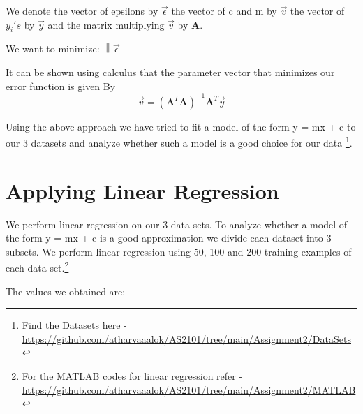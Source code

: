 \documentclass[14pt]{article}
\begin{document}
    \noindent We denote the vector of epsilons by $ \vec{\epsilon} $ the vector of c and m by $ \vec{v} $ the vector of $ y_{i}'s $ by $ \vec{y} $ and the matrix multiplying $ \vec{v} $ by $ \textbf{A} $.

    \noindent We want to minimize:
    $ \left\lVert \vec{\epsilon} \right\rVert $


    \noindent It can be shown using calculus that the parameter vector that minimizes our error function is given By
    \[ \vec{v} = (\textbf{A}^{T} \textbf{A})^{-1} \textbf{A}^{T} \vec{y} \]


    Using the above approach we have tried to fit a model of the form y = mx + c to our 3 datasets and analyze whether such a model is a good choice for our data \footnote[2]{Find the Datasets here - \url{https://github.com/atharvaaalok/AS2101/tree/main/Assignment2/DataSets}}.




    \huge
    \section{Applying Linear Regression}
    \normalsize
    We perform linear regression on our 3 data sets. To analyze whether a model of the form y = mx + c is a good approximation we divide each dataset into 3 subsets. We perform linear regression using 50, 100 and 200 training examples of each data set.\footnote[8]{For the MATLAB codes for linear regression refer - \url{https://github.com/atharvaaalok/AS2101/tree/main/Assignment2/MATLAB}}

    \noindent The values we obtained are: \\
\end{document}
